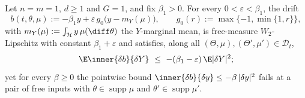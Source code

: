\begin{proposition}\label{prop:strict}
Let $n=m=1$, $d\ge1$ and $G=1$, and fix $\beta_1>0$. For every $0<\varepsilon<\beta_1$,
the drift
\begin{equation}\label{eq:bmean}
b(t,\theta,\mu):=-\beta_1 y+\varepsilon\,g_0\bigl(y-m_Y(\mu)\bigr),\qquad
g_0(r):=\max\{-1,\min\{1,r\}\},
\end{equation}
with $m_Y(\mu):=\int_{\mathcal H}y\,\mu(\diff\theta)$ the $Y$-marginal mean, is
free-measure $W_2$-Lipschitz with constant $\beta_1+\varepsilon$ and satisfies, along
all $(\Theta,\mu),(\Theta',\mu')\in\mathcal D_t$,
\begin{equation}\label{eq:diagdrift}
\E\inner{\delta b}{\delta Y}\ \le\ -(\beta_1-\varepsilon)\,\E|\delta Y|^2 ;
\end{equation}
yet for every $\beta\ge0$ the pointwise bound
$\inner{\delta b}{\delta y}\le-\beta\,|\delta y|^2$ fails at a pair of free inputs with
$\theta\in\operatorname{supp}\mu$ and $\theta'\in\operatorname{supp}\mu'$.
\end{proposition}
